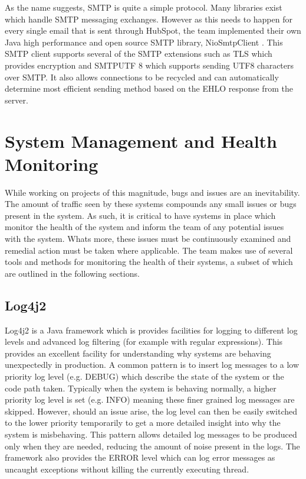 As the name suggests, SMTP is quite a simple protocol. Many libraries exist which handle SMTP messaging exchanges. However as this needs to happen for every single email that is sent through HubSpot, the \team{} team implemented their own Java high performance and open source SMTP library, NioSmtpClient \cite{hubspotSmtp}. This SMTP client supports several of the SMTP extensions such as TLS which provides encryption and SMTPUTF 8 which supports sending UTF8 characters over SMTP. It also allows connections to be recycled and can automatically determine most efficient sending method based on the EHLO response from the server.     

\section{System Management and Health Monitoring}
While working on projects of this magnitude, bugs and issues are an inevitability. The amount of traffic seen by these systems compounds any small issues or bugs present in the system. As such, it is critical to have systems in place which monitor the health of the system and inform the team of any potential issues with the system. Whats more, these issues must be continuously examined and remedial action must be taken where applicable. The \team{} team makes use of several tools and methods for monitoring the health of their systems, a subset of which are outlined in the following sections.

\subsection{Log4j2}\label{sec:log4j2}
Log4j2 \cite{log4j2} is a Java framework which is provides facilities for logging to different log levels and advanced log filtering (for example with regular expressions). This provides an excellent facility for understanding why systems are behaving unexpectedly in production. A common pattern is to insert log messages to a low priority log level (e.g. DEBUG) which describe the state of the system or the code path taken. Typically when the system is behaving normally, a higher priority log level is set (e.g. INFO) meaning these finer grained log messages are skipped. However, should an issue arise, the log level can then be easily switched to the lower priority temporarily to get a more detailed insight into why the system is misbehaving. This pattern allows detailed log messages to be produced only when they are needed, reducing the amount of noise present in the logs. The framework also provides the ERROR level which can log error messages as uncaught exceptions without killing the currently executing thread.

